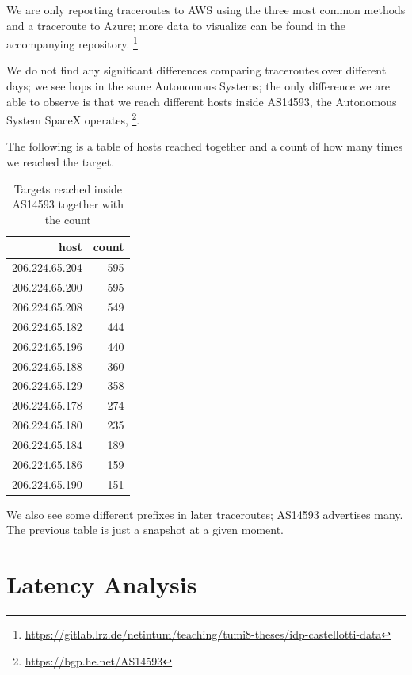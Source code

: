 \documentclass[IN,11pt,twoside,openright,idp,english]{tumthesis}
\begin{document}
We are only reporting traceroutes to AWS using the three most common methods and a traceroute to Azure; more data to visualize can be found in the accompanying repository. \footnote{\url{https://gitlab.lrz.de/netintum/teaching/tumi8-theses/idp-castellotti-data}}
    
We do not find any significant differences comparing traceroutes over different days; we see hops in the same Autonomous Systems; the only difference we are able to observe is that we reach different hosts inside AS14593, the Autonomous System SpaceX operates, \footnote{\url{https://bgp.he.net/AS14593}}.
    
The following is a table of hosts reached together and a count of how many times we reached the target.
    
\begin{table}
    \centering
    \begin{tabular}{ r r }
        \toprule
            host           & count \\ 
            \midrule
            206.224.65.204 & 595   \\
            206.224.65.200 & 595   \\
            206.224.65.208 & 549   \\ 
            206.224.65.182 & 444   \\
            206.224.65.196 & 440   \\ 
            206.224.65.188 & 360   \\ 
            206.224.65.129 & 358   \\ 
            206.224.65.178 & 274   \\ 
            206.224.65.180 & 235   \\ 
            206.224.65.184 & 189   \\ 
            206.224.65.186 & 159   \\ 
            206.224.65.190 & 151   \\
            \bottomrule
    \end{tabular}
    \caption{Targets reached inside AS14593 together with the count}
\end{table}
    
We also see some different prefixes in later traceroutes; AS14593 advertises many. The previous table is just a snapshot at a given moment.
    
\section{Latency Analysis}
\end{document}
